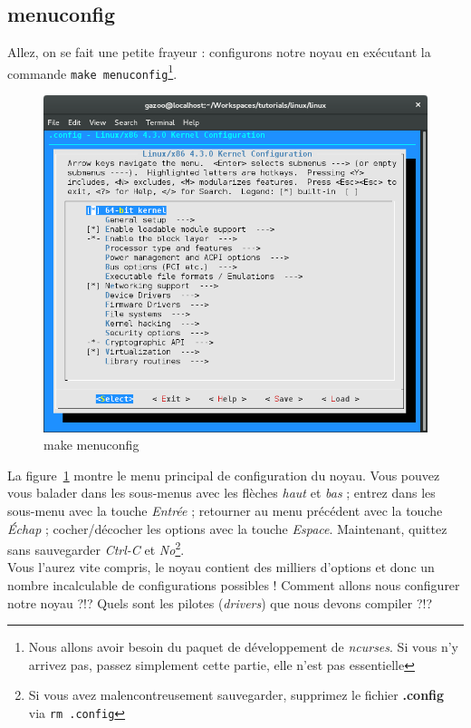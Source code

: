 \documentclass[a4paper]{article}
\begin{document}
\subsection{menuconfig}

Allez, on se fait une petite frayeur : configurons notre noyau en exécutant la commande \lstinline{make menuconfig}\footnote{Nous allons avoir besoin du paquet de développement de \textit{ncurses}. Si vous n'y arrivez pas, passez simplement cette partie, elle n'est pas essentielle}.\\

\begin{figure}
\label{fig:make_menuconfig}
\includegraphics[scale=0.5]{../res/make-menuconfig.png}
\caption{make menuconfig}
\end{figure}

La figure~\ref{fig:make_menuconfig} montre le menu principal de configuration du noyau. Vous pouvez vous balader dans les sous-menus avec les flèches \textit{haut} et \textit{bas} ; entrez dans les sous-menu avec la touche \textit{Entrée} ; retourner au menu précédent avec la touche \textit{Échap} ; cocher/décocher les options avec la touche \textit{Espace}. Maintenant, quittez sans sauvegarder \textit{Ctrl-C} et \textit{No}\footnote{Si vous avez malencontreusement sauvegarder, supprimez le fichier \textbf{.config} via \lstset{language=sh}\lstinline{rm .config}}.\\

Vous l'aurez vite compris, le noyau contient des milliers d'options et donc un nombre incalculable de configurations possibles ! Comment allons nous configurer notre noyau ?!? Quels sont les pilotes (\textit{drivers}) que nous devons compiler ?!?
\end{document}
